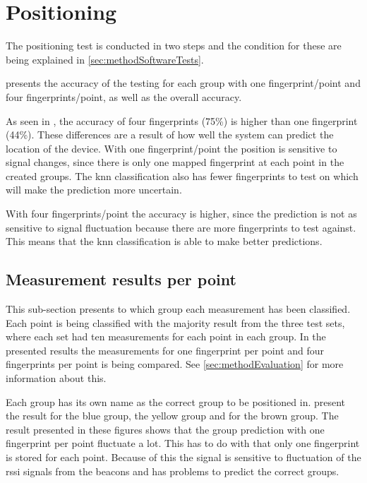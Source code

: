 \section{Positioning}\label{sec:resultPos}
The positioning test is conducted in two steps and the condition for these are being explained in \cref{sec:methodSoftwareTests}.

\bigskip

 presents the accuracy of the testing for each group with one fingerprint/point and four fingerprints/point, as well as the overall accuracy.


As seen in , the accuracy of four fingerprints (75\%) is higher than one fingerprint (44\%).
These differences are a result of how well the system can predict the location of the device.
With one fingerprint/point the position is sensitive to signal changes, since there is only one mapped fingerprint at each point in the created groups.
The \acrfull{knn} classification also has fewer fingerprints to test on which will make the prediction more uncertain.

\bigskip

With four fingerprints/point the accuracy is higher, since the prediction is not as sensitive to signal fluctuation because there are more fingerprints to test against.
This means that the \acrshort{knn} classification is able to make better predictions. 


\subsection{Measurement results per point}\label{sec:resultsPosOneFingerprint}
This sub-section presents to which group each measurement has been classified.
Each point is being classified with the majority result from the three test sets, where each set had ten measurements for each point in each group.
In the presented results the measurements for one fingerprint per point and four fingerprints per point is being compared.
See \cref{sec:methodEvaluation} for more information about this.

\bigskip

Each group has its own name as the correct group to be positioned in.
 present the result for the blue group,  the yellow group and  for the brown group.
The result presented in these figures shows that the group prediction with one fingerprint per point fluctuate a lot.
This has to do with that only one fingerprint is stored for each point.
Because of this the signal is sensitive to fluctuation of the \acrfull{rssi} signals from the beacons and has problems to predict the correct groups.

